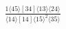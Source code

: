 \documentclass[varwidth, border=5pt]{standalone}
\begin{document}
\begin{my}
$\begin{gathered}
\scriptscriptstyle\frac{1⟨45⟩[34]⟨13⟩⟨24⟩}{⟨14⟩[14]⟨15⟩^2⟨35⟩}
\end{gathered}$
\end{my}
\end{document}
